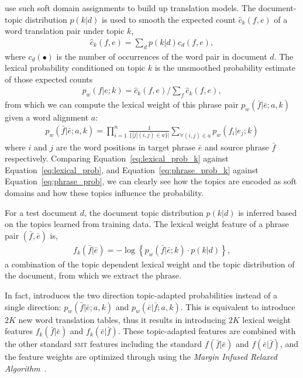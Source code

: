\citet{Eidelman-12} use such soft domain assignments to build up translation models. The document-topic distribution $p(k|d)$ is used to smooth the expected count $\hat{c}_{k}(f,e)$ of a word translation pair under topic $k$,
\begin{align}
\textstyle \hat{c}_{k}(f,e) = \sum_{d}{p(k|d)c_d(f,e)},
\end{align}
where $c_d(\bullet)$ is the number of occurrences of the word pair in document $d$.  The lexical probability conditioned on topic $k$ is the unsmoothed probability estimate of those expected counts
\begin{align}
\label{eq:lexical_prob_k}
\textstyle p_w(f|e;k) = \hat{c}_{k}(f,e) / \sum_f{\hat{c}_{k}(f,e)},
\end{align}
from which we can compute the lexical weight of this phrase pair
$p_w(\bar{f}|\bar{e};a, k)$ given a word alignment $a$\citep{koehn-03}:
\begin{align}
\label{eq:phrase_prob_k}
p_w(\bar{f} | \bar{e};a, k) = \prod^{n}_{i=1} \frac{1}{\{|j | (i, j) \in a\}|} \sum_{\forall (i,j) \in a} p_w(f_i | e_j; k)
\end{align}
where $i$ and $j$ are the word positions in target phrase $\bar{e}$ and source phrase $\bar{f}$ respectively. Comparing Equation~\ref{eq:lexical_prob_k} against Equation~\ref{eq:lexical_prob}, and Equation~\ref{eq:phrase_prob_k} against Equation~\ref{eq:phrase_prob}, we can clearly see how the topics are encoded as soft domains and how these topics influence the probability.

For a test document $d$, the document topic distribution $p(k | d)$ is inferred based on the topics learned from training data. The lexical weight feature of a phrase pair $(\bar{f}, \bar{e})$ is,
\begin{align}
\textstyle f_{k}(\bar{f}|\bar{e})=-\log\left\{{p_{w}(\bar{f}|\bar{e};k)\cdot p(k|d)}\right\},
\end{align}
a combination of the topic dependent lexical weight and the topic distribution of the document, from which we extract the phrase.

In fact, \citet{Eidelman-12} introduces the two direction topic-adapted probabilities instead of a single direction: $p_w(\bar{f} | \bar{e};a, k)$ and $p_w(\bar{e} | \bar{f};a, k)$. This is equivalent to introduce $2K$ new word translation tables, thus it results in introducing $2K$ lexical weight features $f_{k}(\bar{f}|\bar{e})$ and $f_{k}(\bar{e}|\bar{f})$. These topic-adapted features are combined with the other standard \textsc{smt} features including the standard $f(\bar{f}|\bar{e})$ and $f(\bar{e}|\bar{f})$, and the feature weights are optimized through using the \emph{Margin Infused Relaxed Algorithm}~\cite[\textsc{mira}]{Crammer-06}. 

